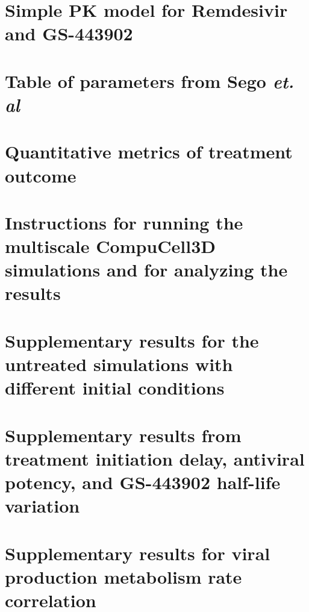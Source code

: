 \section{Simple PK model for Remdesivir and GS-443902}\label{sup:sec:pk_params}


\section{Table of parameters from Sego \emph{et. al}}\label{sup:remdes:sec:sego_params}%

\section{Quantitative metrics of treatment outcome}\label{sup:remdes:sec:quantify_results}

\section{Instructions for running the multiscale CompuCell3D simulations and for analyzing the results}\label{sup:sec:cc3d_instructions}


\section{Supplementary results for the untreated simulations with different initial conditions}\label{sup:remdes:sec:untreated-extra}


\section{Supplementary results from treatment initiation delay, antiviral potency, and GS-443902 half-life variation}\label{sup:remdes:sec:extra_figures}


\section{Supplementary results for viral production metabolism rate correlation}\label{sup:remdes:sec:super_spreaders}

